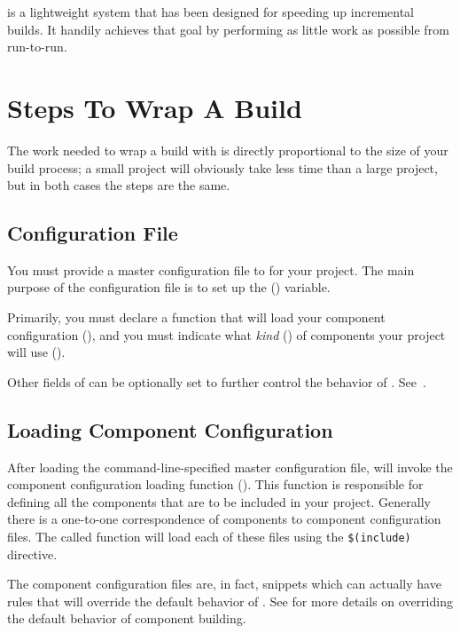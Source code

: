 \lmsbw is a lightweight system that has been designed for speeding up
incremental builds.  It handily achieves that goal by performing as
little work as possible from run-to-run.

\section{Steps To Wrap A Build}

The work needed to wrap a build with \lmsbw is directly proportional
to the size of your build process; a small project will obviously take
less time than a large project, but in both cases the steps are the
same.

\subsection{Configuration File}

You must provide a master configuration file to \lmsbw for your
project.  The main purpose of the configuration file is to set up the
\lmsbwconfiguration () variable.

Primarily, you must declare a \gnumake function that will load your
component configuration
(), and you must indicate
what \emph{kind} () of components your project
will use ().

Other fields of \lmsbwconfiguration can be optionally set to further
control the behavior of \lmsbw.
See~.

\subsection{Loading Component Configuration}

After loading the command-line-specified master configuration file,
\lmsbw will invoke the component configuration loading function
().  This function is
responsible for defining all the components that are to be included in
your project.  Generally there is a one-to-one correspondence of
components to component configuration files.  The called function will
load each of these files using the \gnumake \texttt{\$(include)}
directive.

The component configuration files are, in fact, \makefile snippets
which can actually have rules that will override the default behavior
of \lmsbw.  See  for more details on overriding
the default behavior of component building.

